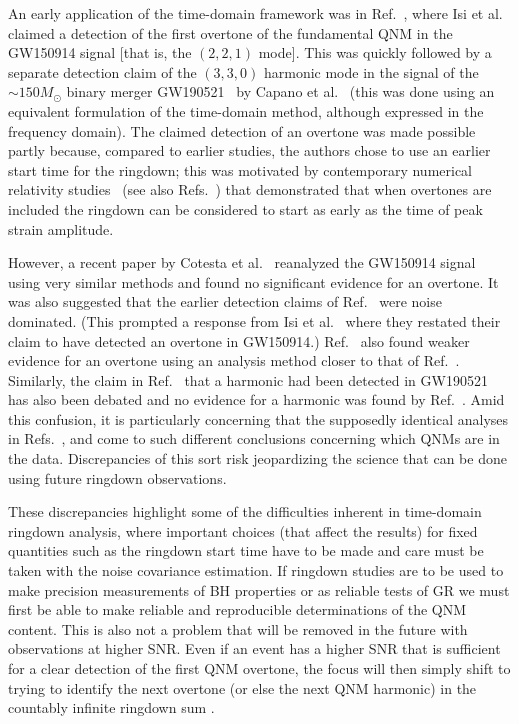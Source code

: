 An early application of the time-domain framework was in Ref.~\cite{Isi:2019aib}, where Isi et al. claimed a detection of the first overtone of the fundamental QNM in the GW150914 signal [that is, the $(2, 2, 1)$ mode]. 
This was quickly followed by a separate detection claim of the $(3,3,0)$ harmonic mode in the signal of the $\sim 150M_\odot$ binary merger GW190521~\cite{LIGOScientific:2020iuh} by Capano et al.~\cite{Capano:2021etf} (this was done using an equivalent formulation of the time-domain method, although expressed in the frequency domain).
The claimed detection of an overtone was made possible partly because, compared to earlier studies, the authors chose to use an earlier start time for the ringdown; this was motivated by contemporary numerical relativity studies~\cite{Giesler:2019uxc} (see also Refs.~\cite{Bhagwat:2019dtm, Ota:2019bzl, Cook:2020otn, JimenezForteza:2020cve, Dhani:2020nik, Finch:2021iip, Forteza:2021wfq, Dhani:2021vac, MaganaZertuche:2021syq}) that demonstrated that when overtones are included the ringdown can be considered to start as early as the time of peak strain amplitude. 

However, a recent paper by Cotesta et al.~\cite{Cotesta:2022pci} reanalyzed the GW150914 signal using very similar methods and found no significant evidence for an overtone.
It was also suggested that the earlier detection claims of Ref.~\cite{Isi:2019aib} were noise dominated.
(This prompted a response from Isi et al.~\cite{Isi:2022mhy} where they restated their claim to have detected an overtone in GW150914.) 
Ref.~\cite{Bustillo:2020buq} also found weaker evidence for an overtone using an analysis method closer to that of Ref.~\cite{LIGOScientific:2016lio}.
Similarly, the claim in Ref.~\cite{Capano:2021etf} that a harmonic had been detected in GW190521 has also been debated and no evidence for a harmonic was found by Ref.~\cite{LIGOScientific:2021sio}.
Amid this confusion, it is particularly concerning that the supposedly identical analyses in Refs.~\cite{Isi:2019aib, Isi:2022mhy}, and \cite{Cotesta:2022pci} come to such different conclusions concerning which QNMs are in the data. 
Discrepancies of this sort risk jeopardizing the science that can be done using future ringdown observations.

These discrepancies highlight some of the difficulties inherent in time-domain ringdown analysis, where important choices (that affect the results) for fixed quantities such as the ringdown start time have to be made and care must be taken with the noise covariance estimation.
If ringdown studies are to be used to make precision measurements of BH properties or as reliable tests of GR we must first be able to make reliable and reproducible determinations of the QNM content.
This is also not a problem that will be removed in the future with observations at higher SNR. Even if an event has a higher SNR that is sufficient for a clear detection of the first QNM overtone, the focus will then simply shift to trying to identify the next overtone (or else the next QNM harmonic) in the countably infinite ringdown sum \cite{Bustillo:2020buq}.

